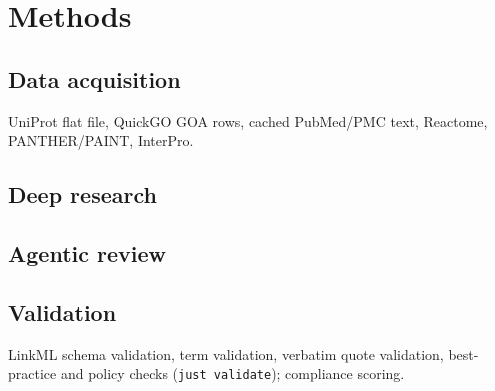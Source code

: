 \section{Methods}\label{sec:methods}
\subsection{Data acquisition} UniProt flat file, QuickGO GOA rows, cached PubMed/PMC text,
Reactome, PANTHER/PAINT, InterPro. 
\subsection{Deep research} 
\subsection{Agentic review} 
\subsection{Validation} LinkML schema validation, term validation, verbatim quote validation,
best-practice and policy checks (\texttt{just validate}); compliance scoring.

